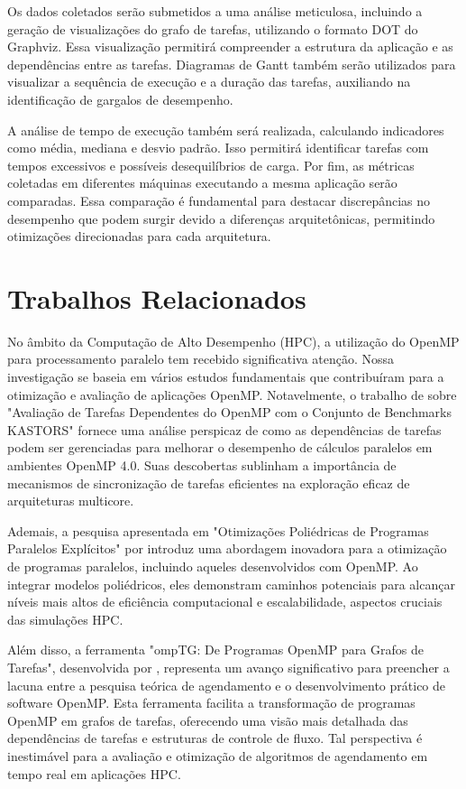 \documentclass[ppgc,diss]{iiufrgs}
\begin{document}
Os dados coletados serão submetidos a uma análise meticulosa, incluindo a geração de visualizações do grafo de tarefas, utilizando o formato DOT do Graphviz. Essa visualização permitirá compreender a estrutura da aplicação e as dependências entre as tarefas. Diagramas de Gantt também serão utilizados para visualizar a sequência de execução e a duração das tarefas, auxiliando na identificação de gargalos de desempenho.

A análise de tempo de execução também será realizada, calculando indicadores como média, mediana e desvio padrão. Isso permitirá identificar tarefas com tempos excessivos e possíveis desequilíbrios de carga. Por fim, as métricas coletadas em diferentes máquinas executando a mesma aplicação serão comparadas. Essa comparação é fundamental para destacar discrepâncias no desempenho que podem surgir devido a diferenças arquitetônicas, permitindo otimizações direcionadas para cada arquitetura.


\section{Trabalhos Relacionados}
No âmbito da Computação de Alto Desempenho (HPC), a utilização do OpenMP para processamento paralelo tem recebido significativa atenção. Nossa investigação se baseia em vários estudos fundamentais que contribuíram para a otimização e avaliação de aplicações OpenMP. Notavelmente, o trabalho de  sobre "Avaliação de Tarefas Dependentes do OpenMP com o Conjunto de Benchmarks KASTORS" fornece uma análise perspicaz de como as dependências de tarefas podem ser gerenciadas para melhorar o desempenho de cálculos paralelos em ambientes OpenMP 4.0. Suas descobertas sublinham a importância de mecanismos de sincronização de tarefas eficientes na exploração eficaz de arquiteturas multicore.

Ademais, a pesquisa apresentada em "Otimizações Poliédricas de Programas Paralelos Explícitos" por  introduz uma abordagem inovadora para a otimização de programas paralelos, incluindo aqueles desenvolvidos com OpenMP. Ao integrar modelos poliédricos, eles demonstram caminhos potenciais para alcançar níveis mais altos de eficiência computacional e escalabilidade, aspectos cruciais das simulações HPC.

Além disso, a ferramenta "ompTG: De Programas OpenMP para Grafos de Tarefas", desenvolvida por , representa um avanço significativo para preencher a lacuna entre a pesquisa teórica de agendamento e o desenvolvimento prático de software OpenMP. Esta ferramenta facilita a transformação de programas OpenMP em grafos de tarefas, oferecendo uma visão mais detalhada das dependências de tarefas e estruturas de controle de fluxo. Tal perspectiva é inestimável para a avaliação e otimização de algoritmos de agendamento em tempo real em aplicações HPC.
\end{document}

